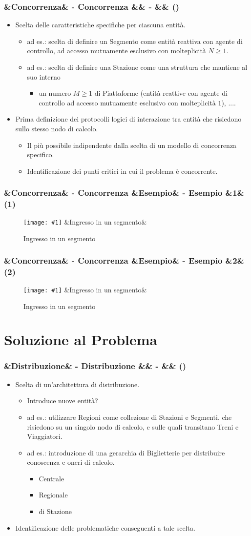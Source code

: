 \documentclass[slidestop,compress,blackandwhite]{beamer}
\newcommand{\newtitle}[4]{
	#1 
	\ifx&#2&%
	\else
  		\large- #2
	\fi
	\ifx&#3&%
	\else
  		\normalsize- #3
	\fi
	\ifx&#4&%
	\else
  		\normalsize (#4)
	\fi
}
\newcommand{\newframe}[5]{
	\begin{frame}
		\frametitle{\newtitle{#1}{#2}{#3}{#4}}
		#5
	\end{frame}
}
\newcommand{\myitemize}[1]{
	\begin{itemize}\itemsep4pt
	#1
	\end{itemize}
}
\newcommand{\newfigure}[3]{
	\begin{figure}
		\centering
		\texttt{[image: \#1]}
		\ifx&#3&%
		\else
	  		\caption{\scriptsize #3}
		\fi
	\end{figure}
}
\begin{document}
	
	\newframe{}{Concorrenza}{}{}{
		
		\myitemize {
			\item Scelta delle caratteristiche specifiche per ciascuna entità.
				\myitemize {
					\item ad es.: scelta di definire un Segmento come entità reattiva con agente di controllo, ad accesso mutuamente esclusivo con molteplicità $N\ge1$.
					\item ad es.: scelta di definire una Stazione come una struttura che mantiene al suo interno
						\myitemize {
							\item un numero $M\ge1$ di Piattaforme (entità reattive con agente di controllo ad accesso mutuamente esclusivo con molteplicità $1$),	....
						}
				}
			\item Prima definizione dei protocolli logici di interazione tra entità che risiedono sullo stesso nodo di calcolo.
				\myitemize {
					\item Il più possibile indipendente dalla scelta di un modello di concorrenza specifico.
					\item Identificazione dei punti critici in cui il problema è concorrente.
				}
				
		}
		
	}
	
	\newframe{}{Concorrenza}{Esempio}{1}{
		\newfigure{imgs/ingresso_segmento}{0.5}{Ingresso in un segmento}
	}
	
	\newframe{}{Concorrenza}{Esempio}{2}{
		\newfigure{imgs/ingresso_stazione}{0.5}{Ingresso in un segmento}
	}
	
	
	
\section{Soluzione al Problema}\label{sol}

	\newframe{}{Distribuzione}{}{} {
		\myitemize {
			\item Scelta di un'architettura di distribuzione.
				\myitemize {
					\item Introduce nuove entità?
					\item ad es.: utilizzare Regioni come collezione di Stazioni e Segmenti, che risiedono su un singolo nodo di calcolo, e sulle quali transitano Treni e Viaggiatori.
					\item ad es.: introduzione di una gerarchia di Biglietterie per distribuire conoscenza e oneri di calcolo.
						\myitemize {
							\item Centrale
							\item Regionale
							\item di Stazione
						}
				}
			\item Identificazione delle problematiche conseguenti a tale scelta.
				
		}
	}
\end{document}
